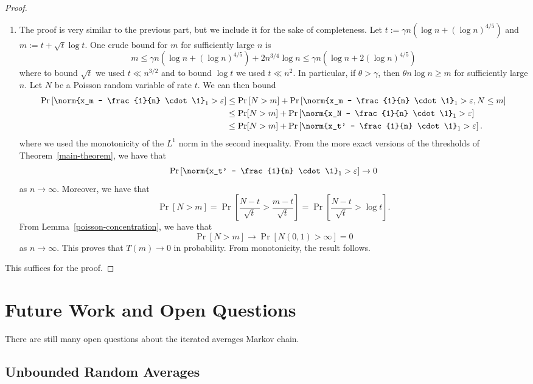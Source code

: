 \documentclass[12pt]{article}
\begin{document}
\begin{proof}
\begin{enumerate}[label = (\alph*)]
		\item The proof is very similar to the previous part, but we include it for the sake of completeness. Let $t := \gamma n (\log n + (\log n)^{4/5})$ and $m := t + \sqrt{t} \log t$. One crude bound for $m$ for sufficiently large $n$ is
		\[
			m \leq \gamma n ( \log n + (\log n)^{4/5}) + 2n^{3/4} \log n \leq \gamma n (\log n + 2(\log n)^{4/5} )
		\]
		where to bound $\sqrt{t}$ we used $t \ll n^{3/2}$ and to bound $\log t$ we used $t \ll n^2$. In particular, if $\theta > \gamma$, then $\theta n \log n \geq m$ for sufficiently large $n$. Let $N$ be a Poisson random variable of rate $t$. We can then bound
		\begin{align*}
			\Pr \left [ \norm{x_m - \frac{1}{n} \cdot \1}_1 > \varepsilon \right ] & \leq \Pr \left [ N > m \right ] + \Pr \left [ \norm{x_m - \frac{1}{n} \cdot \1}_1 > \varepsilon, N \leq m \right ] \\
			& \leq \Pr [N > m] + \Pr \left [ \norm{x_N - \frac{1}{n} \cdot \1}_1 > \varepsilon \right ] \\
			& \leq \Pr [N > m] + \Pr \left [ \norm{x_t' - \frac{1}{n} \cdot \1}_1 > \varepsilon \right].
		\end{align*}
		where we used the monotonicity of the $L^1$ norm in the second inequality. From the more exact versions of the thresholds of Theorem~\ref{main-theorem}, we have that 
		\[
			\Pr \left [ \norm {x_t' - \frac{1}{n} \cdot \1}_1 > \varepsilon \right ] \to 0
		\]
		as $n \to \infty$. Moreover, we have that 
		\[
			\Pr [N > m] = \Pr \left [ \frac{N - t}{\sqrt{t}} > \frac{m - t}{\sqrt{t}} \right ] = \Pr \left [ \frac{N-t}{\sqrt{t}} > \log t \right ].
		\]
		From Lemma~\ref{poisson-concentration}, we have that 
		\[
			\Pr [N > m] \to \Pr[N(0, 1) > \infty] = 0
		\]
		as $n \to \infty$. This proves that $T(m) \to 0$ in probability. From monotonicity, the result follows.
	\end{enumerate}
	This suffices for the proof. 
\end{proof}

\section{Future Work and Open Questions} 

There are still many open questions about the iterated averages Markov chain. 

\subsection{Unbounded Random Averages}
\end{document}
